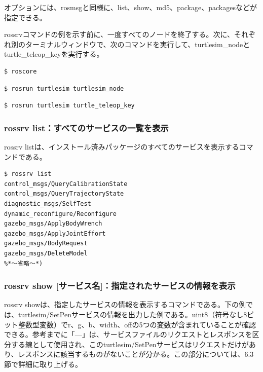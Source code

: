 オプションには、rosmsgと同様に、list、show、md5、package、packagesなどが指定できる。

rossrvコマンドの例を示す前に、一度すべてのノードを終了する。次に、それぞれ別のターミナルウィンドウで、次のコマンドを実行して、turtlesim\_nodeとturtle\_teleop\_keyを実行する。

\begin{lstlisting}[language=ROS]
$ roscore
\end{lstlisting}

\begin{lstlisting}[language=ROS]
$ rosrun turtlesim turtlesim_node
\end{lstlisting}

\begin{lstlisting}[language=ROS]
$ rosrun turtlesim turtle_teleop_key
\end{lstlisting}


\subsubsection{rossrv list：すべてのサービスの一覧を表示}

rossrv listは、インストール済みパッケージのすべてのサービスを表示するコマンドである。

\begin{lstlisting}[language=ROS]
$ rossrv list
control_msgs/QueryCalibrationState
control_msgs/QueryTrajectoryState
diagnostic_msgs/SelfTest
dynamic_reconfigure/Reconfigure
gazebo_msgs/ApplyBodyWrench
gazebo_msgs/ApplyJointEffort
gazebo_msgs/BodyRequest
gazebo_msgs/DeleteModel
%*〜省略〜*)
\end{lstlisting}

\subsubsection{rossrv show [サービス名]：指定されたサービスの情報を表示}

rossrv showは、指定したサービスの情報を表示するコマンドである。下の例では、turtlesim/SetPenサービスの情報を出力した例である。uint8（符号なし8ビット整数型変数）でr、g、b、width、offの5つの変数が含まれていることが確認できる。参考までに「---」は、サービスファイルのリクエストとレスポンスを区分する線として使用され、このturtlesim/SetPenサービスはリクエストだけがあり、レスポンスに該当するものがないことが分かる。この部分については、6.3節で詳細に取り上げる。

